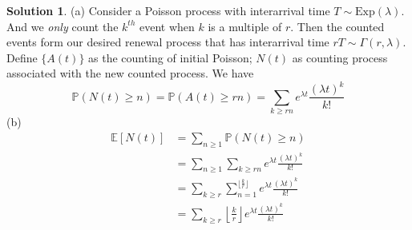 \documentclass[a4paper, 10pt]{article}
\theoremstyle{definition}
\theoremstyle{hSol}
\newtheorem*{solution}{Solution}
\begin{document}
\begin{solution} (a) Consider a Poisson process with interarrival time $T\sim \text{Exp}(\lambda)$. And we \emph{only} count the $k^{th}$ event when $k$ is a multiple of $r$. Then the counted events form our desired renewal process that has interarrival time $rT\sim \Gamma(r, \lambda)$. \\
Define $\{A(t)\}$ as the counting of initial Poisson; $N(t)$ as counting process associated with the new counted process. We have
\begin{equation}
  \mathbb{P}\left(N(t)\geq n\right) = \mathbb{P}\left(A(t)\geq rn\right) = \sum_{k\geq rn} e^{\lambda t}\frac{(\lambda t)^k}{k!}
\end{equation}
(b) 
\begin{equation}
  \begin{split}
    \mathbb{E}\left[N(t)\right] &= \sum_{n\geq 1} \mathbb{P}\left(N(t)\geq n\right) \\
    &= \sum_{n\geq 1} \sum_{k\geq rn} e^{\lambda t}\frac{(\lambda t)^k}{k!} \\
    &= \sum_{k\geq r} \sum_{n=1}^{\lfloor\frac{k}{r}\rfloor} e^{\lambda t}\frac{(\lambda t)^k}{k!} \\
    &= \sum_{k\geq r} \left\lfloor \frac{k}{r} \right\rfloor e^{\lambda t}\frac{(\lambda t)^k}{k!}
  \end{split}
\end{equation}
\end{solution}
\end{document}
